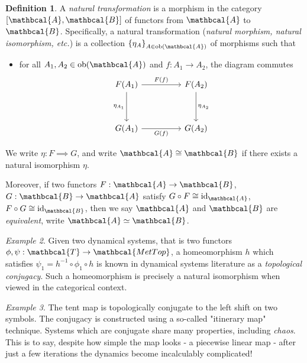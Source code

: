 \documentclass[a4paper, 10pt]{article}
\newcommand{\ob}{\text{ob}}
\newcommand{\id}{\text{id}}
\newcommand{\sA}{\mathbcal{A}}
\newcommand{\sB}{\mathbcal{B}}
\newcommand{\bT}{\mathbcal{T}}
\newcommand{\mettop}{\mathbcal{MetTop}}
\theoremstyle{definition}
\newtheorem{definition}{Definition}[section]
\theoremstyle{remark}
\theoremstyle{remark}
\newtheorem{example}[definition]{Example}
\begin{document}
\begin{definition}
    A \emph{natural transformation} is a morphism in the category $[\sA , \sB]$ of functors from $\sA$ to $\sB$. Specifically, a natural transformation (\emph{natural morphism, natural isomorphism, etc.}) is a collection $\left\{ \eta_A \right\}_{A \in \ob (\sA)}$ of morphisms such that 

    \begin{itemize}
        \item for all $A_1, A_2 \in \ob (\sA)$ and $f: A_1 \to A_2$, the diagram commutes
            \[\begin{tikzcd}
                {F(A_1)} && {F(A_2)} \\
                \\
                {G(A_1)} && {G(A_2)}
                \arrow["{F(f)}", from=1-1, to=1-3]
                \arrow["{\eta_{A_2}}", from=1-3, to=3-3]
                \arrow["{\eta_{A_1}}"', from=1-1, to=3-1]
                \arrow["{G(f)}"', from=3-1, to=3-3]
            \end{tikzcd}\]  
    \end{itemize}

    We write $\eta: F \implies G$, and write $\sA \cong \sB$ if there exists a natural isomorphism $\eta$. 
    
    Moreover, if two functors $F: \sA \to \sB$, $G: \sB \to \sA$ satisfy $G \circ F \cong \id_{\sA}$, $F \circ G \cong \id_{\sB}$, then we say $\sA$ and $\sB$ are \emph{equivalent}, write $\sA \simeq \sB$. 
\end{definition}

\begin{example}
    Given two dynamical systems, that is two functors $\phi, \psi :  \bT \to \mettop$, a homeomorphism $h$ which satisfies $\psi_1 = h^{-1} \circ \phi_1 \circ h$ is known in dynamical systems literature as a \emph{topological conjugacy}. Such a homeomorphism is precisely a natural isomorphism when viewed in the categorical context. 
\end{example}

\begin{example}
    The tent map is topologically conjugate to the left shift on two symbols. The conjugacy is constructed using a so-called "itinerary map" technique. Systems which are conjugate share many properties, including \emph{chaos}. This is to say, despite how simple the map looks - a piecewise linear map - after just a few iterations the dynamics become incalculably complicated!
\end{example}
\end{document}
